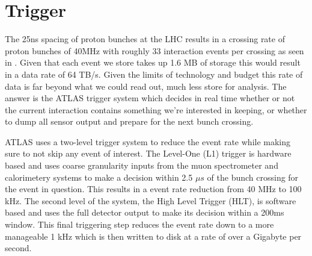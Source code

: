 \section{Trigger} \label{sec:atlas:trigger}

The 25ns spacing of proton bunches at the LHC results in a crossing rate of
proton bunches of 40MHz with roughly 33 \pp interaction events per crossing as
seen in .  Given that each event we store takes up 1.6 MB of
storage this would result in a data rate of 64 TB/s.  Given the limits of
technology and budget this rate of data is far beyond what we could read out,
much less store for analysis. The answer is the ATLAS trigger system which
decides in real time whether or not the current interaction contains something
we're interested in keeping, or whether to dump all sensor output and prepare
for the next bunch crossing.

ATLAS uses a two-level trigger system to reduce the event rate while making
sure to not skip any event of interest.  The Level-One (L1) trigger is hardware
based and uses coarse granularity inputs from the muon spectrometer and
calorimetery systems to make a decision within 2.5 $\mu s$ of the bunch
crossing for the event in question. This results in a event rate reduction from
40 MHz to 100 kHz.  The second level of the system, the High Level Trigger
(HLT), is software based and uses the full detector output to make its decision
within a 200ms window. This final triggering step reduces the event rate down
to a more manageable 1 kHz which is then written to disk at a rate of over a
Gigabyte per second.
